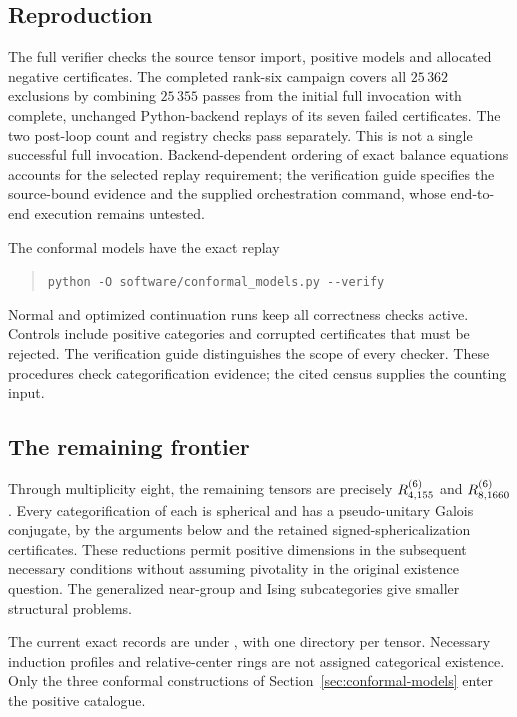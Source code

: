 \subsection{Reproduction}\label{sec:reproduction}\label{sec:frontier}
The full verifier checks the source tensor import, positive models and
allocated negative certificates. The completed rank-six campaign covers
all $25\,362$ exclusions by combining $25\,355$ passes from the initial
full invocation with complete, unchanged Python-backend replays of its
seven failed certificates. The two post-loop count and registry checks
pass separately. This is not a single successful full invocation.
Backend-dependent ordering of exact balance equations accounts for the
selected replay requirement; the verification guide specifies the
source-bound evidence and the supplied orchestration command, whose
end-to-end execution remains untested.

The conformal models have the exact replay
\begin{quote}\small
\verb|python -O software/conformal_models.py --verify|
\end{quote}
Normal and optimized continuation runs keep all correctness checks
active. Controls include positive categories and corrupted certificates
that must be rejected. The verification guide distinguishes the scope
of every checker. These procedures check categorification evidence;
the cited census supplies the counting input.

\subsection{The remaining frontier}\label{sec:research-coverage}
Through multiplicity eight, the remaining tensors are precisely
$R^{(6)}_{4,155}$ and $R^{(6)}_{8,1660}$. Every categorification of each is spherical and has a
pseudo-unitary Galois conjugate, by the arguments below and the retained
signed-sphericalization certificates. These reductions permit positive
dimensions in the subsequent necessary conditions without assuming
pivotality in the original existence question. The generalized near-group
and Ising subcategories give smaller structural problems.

The current exact records are under ,
with one directory per tensor. Necessary induction profiles and
relative-center rings are not assigned categorical existence. Only the
three conformal constructions of Section~\ref{sec:conformal-models}
enter the positive catalogue.




